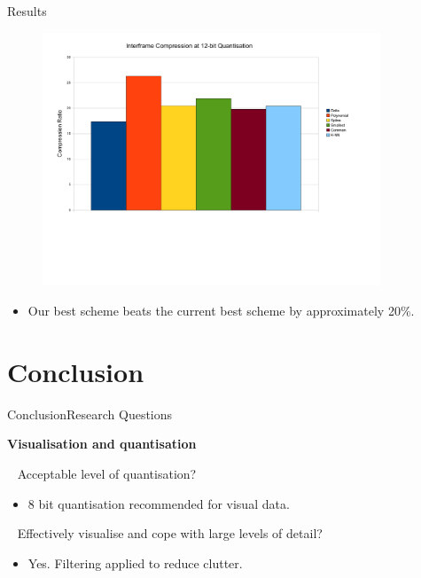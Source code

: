 \documentclass{beamer}
\begin{document}
\begin{frame}{Results}
\begin{figure}[h]
\centering \includegraphics[trim = 10mm 60mm 10mm 5mm, clip,
  width=0.9\textwidth]{julian-images/interframe_results.pdf}
\end{figure}
\begin{itemize}
\item Our best scheme beats the current best scheme by approximately 20\%.
\end{itemize}
\end{frame}


\section{Conclusion}
\begin{frame}{Conclusion}{Research Questions}

\textbf{Visualisation and quantisation}

\ \newline
Acceptable level of quantisation?
\begin{itemize}
  \item 8 bit quantisation recommended for visual data.
\end{itemize}

\ \newline
Effectively visualise and cope with large levels of detail?
\begin{itemize}
  \item Yes. Filtering applied to reduce clutter.
\end{itemize}
\end{frame}
\end{document}
